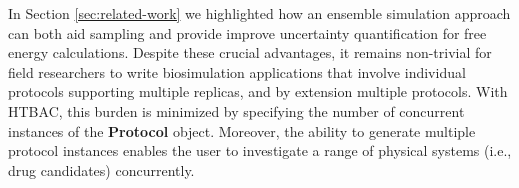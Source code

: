 
	In Section \ref{sec:related-work} we highlighted how an ensemble
simulation approach can both aid sampling and provide improve uncertainty
quantification for free energy calculations. Despite these crucial advantages,
it remains non-trivial for field researchers to write biosimulation
applications that involve individual protocols supporting multiple replicas,
and by extension multiple protocols. With HTBAC, this burden is minimized by
specifying the number of concurrent instances of the \textbf{Protocol} object.
Moreover, the ability to generate multiple protocol instances enables the user
to investigate a range of physical systems (i.e., drug candidates)
concurrently.









